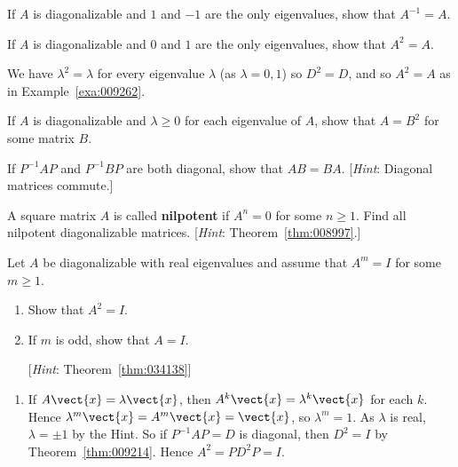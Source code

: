 \begin{multicols}{2}
\begin{ex}
If $A$ is diagonalizable and $1$ and $-1$ are the only eigenvalues, show that $A^{-1} = A$.
\end{ex}

\begin{ex}
If $A$ is diagonalizable and $0$ and $1$ are the only eigenvalues, show that $A^{2} = A$.

\begin{sol}
We have $\lambda^{2} = \lambda$ for every eigenvalue $\lambda$ (as $\lambda = 0, 1$) so $D^{2} = D$, and so $A^{2} = A$ as in Example~\ref{exa:009262}.
\end{sol}
\end{ex}

\begin{ex}
If $A$ is diagonalizable and $\lambda \geq 0$ for each eigenvalue of $A$, show that $A = B^{2}$ for some matrix $B$.
\end{ex}

\begin{ex}
If $P^{-1}AP$ and $P^{-1}BP$ are both diagonal, show that $AB = BA$. [\textit{Hint}: Diagonal matrices commute.]
\end{ex}

\begin{ex}
A square matrix $A$ is called \textbf{nilpotent} if $A^{n} = 0$ for some $n \geq 1$. Find all nilpotent diagonalizable matrices. [\textit{Hint}: Theorem~\ref{thm:008997}.]
\end{ex}




\begin{ex}
Let $A$ be diagonalizable with real eigenvalues and assume that $A^{m} = I$ for some $m \geq 1$.


\begin{enumerate}[label={\alph*.}]
\item Show that $A^{2} = I$.

\item If $m$ is odd, show that $A = I$.


[\textit{Hint}: Theorem~\ref{thm:034138}]

\end{enumerate}
\begin{sol}
\begin{enumerate}[label={\alph*.}]
\item  If $A\vect{x} = \lambda\vect{x}$, then $A^{k}\vect{x} = \lambda^{k}\vect{x}$ for each $k$. Hence $\lambda^{m}\vect{x} = A^{m}\vect{x} = \vect{x}$, so $\lambda^{m} = 1$. As $\lambda$ is real, $\lambda = \pm 1$ by the Hint. So if $P^{-1}AP = D$ is diagonal, then $D^{2} = I$ by Theorem~\ref{thm:009214}. Hence $A^{2} = PD^{2}P = I$.


\end{enumerate}
\end{sol}
\end{ex}
\end{multicols}
